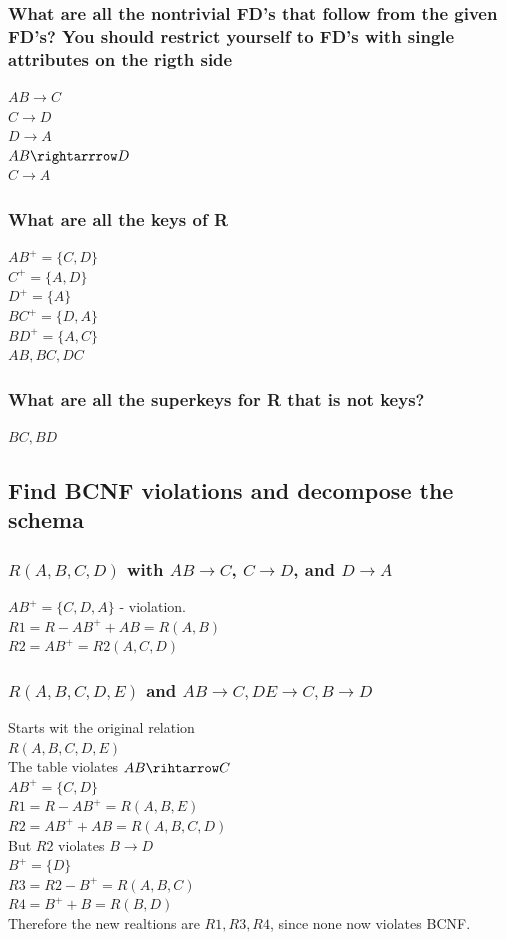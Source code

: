 \documentclass[12pt, a4paper]{article}
\begin{document}
			\subsubsection{What are all the nontrivial FD's that follow from the given FD's? You should restrict yourself to FD's with single attributes on the rigth side}
				$AB\rightarrow C$\\
				$C\rightarrow D$\\
				$D\rightarrow A$\\
				$AB\rightarrrow D$\\
				$C\rightarrow A$
			\subsubsection{What are all the keys of R}
				$AB^+=\{C,D\}$\\
				$C^+=\{A,D\}$\\
				$D^+=\{A\}$\\
				$BC^+=\{D,A\}$\\
				$BD^+=\{A,C\}$\\
				$AB,BC,DC$
			\subsubsection{What are all the superkeys for R that is not keys?}
				$BC,BD$	
		\subsection{Find BCNF violations and decompose the schema}
			\subsubsection{$R(A,B,C,D)$ with $AB\rightarrow C$, $C\rightarrow D$, and $D\rightarrow A$}
				$AB^+=\{C,D,A\}$ - violation.\\
				$R1=R-AB^++AB=R(A,B)$\\
				$R2=AB^+=R2(A,C,D)$
			\subsubsection{$R(A,B,C,D,E)$ and $AB\rightarrow C, DE\rightarrow C, B\rightarrow D$}
				Starts wit the original relation\\
				$R(A,B,C,D,E)$\\
				The table violates $AB\rihtarrow C$\\
				$AB^+=\{C,D\}$\\
				$R1=R-AB^+=R(A,B,E)$\\
				$R2=AB^++AB=R(A,B,C,D)$\\
				But $R2$ violates $B\rightarrow D$\\
				$B^+=\{D\}$\\
				$R3=R2-B^+=R(A,B,C)$\\
				$R4=B^++B=R(B,D)$\\
				Therefore the new realtions are $R1,R3,R4$, since none now violates BCNF.
\end{document}
